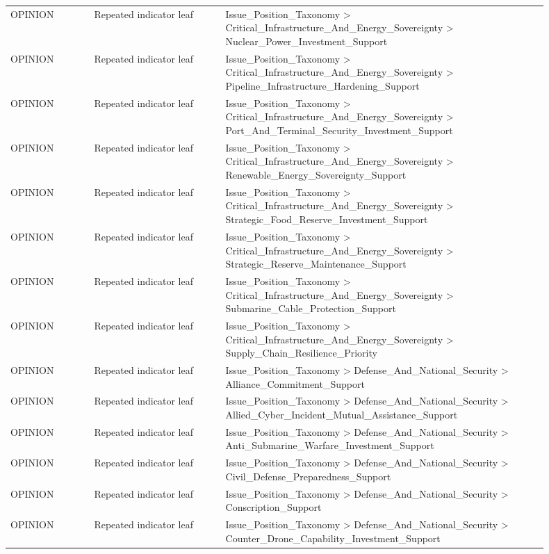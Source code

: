 \begin{table}[htbp]
\begin{threeparttable}
\begin{tabular}{p{0.14\linewidth}p{0.22\linewidth}p{0.54\linewidth}}
OPINION & Repeated indicator leaf & Issue\_Position\_Taxonomy > Critical\_Infrastructure\_And\_Energy\_Sovereignty > Nuclear\_Power\_Investment\_Support \\
OPINION & Repeated indicator leaf & Issue\_Position\_Taxonomy > Critical\_Infrastructure\_And\_Energy\_Sovereignty > Pipeline\_Infrastructure\_Hardening\_Support \\
OPINION & Repeated indicator leaf & Issue\_Position\_Taxonomy > Critical\_Infrastructure\_And\_Energy\_Sovereignty > Port\_And\_Terminal\_Security\_Investment\_Support \\
OPINION & Repeated indicator leaf & Issue\_Position\_Taxonomy > Critical\_Infrastructure\_And\_Energy\_Sovereignty > Renewable\_Energy\_Sovereignty\_Support \\
OPINION & Repeated indicator leaf & Issue\_Position\_Taxonomy > Critical\_Infrastructure\_And\_Energy\_Sovereignty > Strategic\_Food\_Reserve\_Investment\_Support \\
OPINION & Repeated indicator leaf & Issue\_Position\_Taxonomy > Critical\_Infrastructure\_And\_Energy\_Sovereignty > Strategic\_Reserve\_Maintenance\_Support \\
OPINION & Repeated indicator leaf & Issue\_Position\_Taxonomy > Critical\_Infrastructure\_And\_Energy\_Sovereignty > Submarine\_Cable\_Protection\_Support \\
OPINION & Repeated indicator leaf & Issue\_Position\_Taxonomy > Critical\_Infrastructure\_And\_Energy\_Sovereignty > Supply\_Chain\_Resilience\_Priority \\
OPINION & Repeated indicator leaf & Issue\_Position\_Taxonomy > Defense\_And\_National\_Security > Alliance\_Commitment\_Support \\
OPINION & Repeated indicator leaf & Issue\_Position\_Taxonomy > Defense\_And\_National\_Security > Allied\_Cyber\_Incident\_Mutual\_Assistance\_Support \\
OPINION & Repeated indicator leaf & Issue\_Position\_Taxonomy > Defense\_And\_National\_Security > Anti\_Submarine\_Warfare\_Investment\_Support \\
OPINION & Repeated indicator leaf & Issue\_Position\_Taxonomy > Defense\_And\_National\_Security > Civil\_Defense\_Preparedness\_Support \\
OPINION & Repeated indicator leaf & Issue\_Position\_Taxonomy > Defense\_And\_National\_Security > Conscription\_Support \\
OPINION & Repeated indicator leaf & Issue\_Position\_Taxonomy > Defense\_And\_National\_Security > Counter\_Drone\_Capability\_Investment\_Support \\

\end{tabular}
\end{threeparttable}
\end{table}
